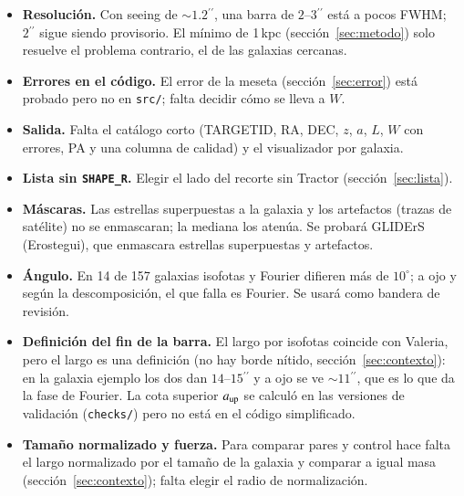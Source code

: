 \documentclass[11pt,a4paper]{article}
\newcommand{\as}{\ensuremath{^{\prime\prime}}}
\newcommand{\code}[1]{\texttt{#1}}
\begin{document}
\begin{itemize}
\item \textbf{Resolución.} Con seeing de $\sim 1.2\as$, una barra de $2$--$3\as$ está a pocos FWHM; $2\as$ sigue
siendo provisorio. El mínimo de 1\,kpc (sección~\ref{sec:metodo}) solo resuelve el problema contrario, el de las
galaxias cercanas.
\item \textbf{Errores en el código.} El error de la meseta (sección~\ref{sec:error}) está probado pero no en
\code{src/}; falta decidir cómo se lleva a $W$.
\item \textbf{Salida.} Falta el catálogo corto (TARGETID, RA, DEC, $z$, $a$, $L$, $W$ con errores, PA y una
columna de calidad) y el visualizador por galaxia.
\item \textbf{Lista sin \code{SHAPE\_R}.} Elegir el lado del recorte sin Tractor (sección~\ref{sec:lista}).
\item \textbf{Máscaras.} Las estrellas superpuestas a la galaxia y los artefactos (trazas de satélite) no se
enmascaran; la mediana los atenúa. Se probará GLIDErS (Erostegui), que enmascara estrellas superpuestas y
artefactos.
\item \textbf{Ángulo.} En 14 de 157 galaxias isofotas y Fourier difieren más de $10^\circ$; a ojo y según la
descomposición, el que falla es Fourier. Se usará como bandera de revisión.
\item \textbf{Definición del fin de la barra.} El largo por isofotas coincide con Valeria, pero el largo es una
definición (no hay borde nítido, sección~\ref{sec:contexto}): en la galaxia ejemplo los dos dan $14$--$15\as$ y a
ojo se ve $\sim 11\as$, que es lo que da la fase de Fourier. La cota superior $a_{\rm up}$ se calculó en las
versiones de validación (\code{checks/}) pero no está en el código simplificado.
\item \textbf{Tamaño normalizado y fuerza.} Para comparar pares y control hace falta el largo normalizado por el
tamaño de la galaxia y comparar a igual masa (sección~\ref{sec:contexto}); falta elegir el radio de normalización.
\end{itemize}
\end{document}
